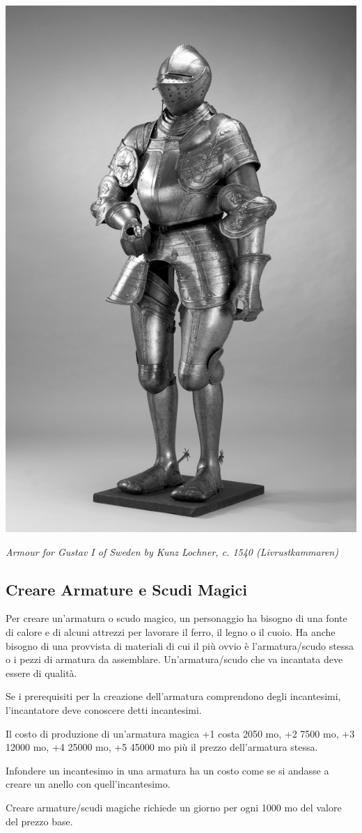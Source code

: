 \begin{multicols}{2}
\begin{center}
	\includegraphics[width=0.55\linewidth]{immagini/Rustning_Gustav_Vasa.png}

	\emph{Armour for Gustav I of Sweden by Kunz Lochner, c. 1540 (Livrustkammaren)}
\end{center}

\subsection{Creare Armature e Scudi Magici}\label{crearearmaturemagiche}

Per creare un'armatura o scudo magico, un personaggio ha bisogno di una fonte di calore e di alcuni attrezzi per lavorare il ferro, il legno o il cuoio. Ha anche bisogno di una provvista di materiali di cui il più ovvio è l'armatura/scudo stessa o i pezzi di armatura da assemblare. Un'armatura/scudo che va incantata deve essere di qualità.

Se i prerequisiti per la creazione dell'armatura comprendono degli incantesimi, l'incantatore deve conoscere detti incantesimi.

Il costo di produzione di un'armatura magica +1 costa 2050 mo, +2 7500 mo, +3 12000 mo, +4 25000 mo, +5 45000 mo più il prezzo dell'armatura stessa.

Infondere un incantesimo in una armatura ha un costo come se si andasse a creare un anello con quell'incantesimo.

Creare armature/scudi magiche richiede un giorno per ogni 1000 mo del valore del prezzo base.


\end{multicols}
